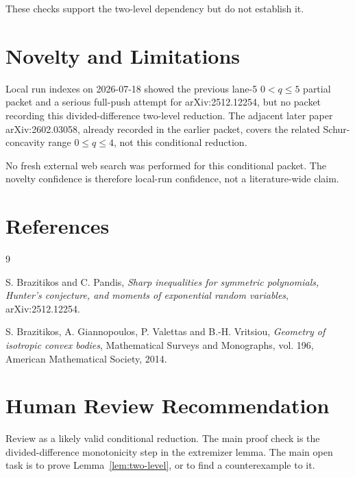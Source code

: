 \documentclass[11pt]{amsart}
\begin{document}
These checks support the two-level dependency but do not establish it.

\section*{Novelty and Limitations}

Local run indexes on 2026-07-18 showed the previous lane-5 \(0<q\le5\)
partial packet and a serious full-push attempt for arXiv:2512.12254, but no
packet recording this divided-difference two-level reduction.  The adjacent
later paper arXiv:2602.03058, already recorded in the earlier packet, covers
the related Schur-concavity range \(0\le q\le4\), not this conditional
reduction.

No fresh external web search was performed for this conditional packet.  The
novelty confidence is therefore local-run confidence, not a literature-wide
claim.

\section*{References}

\begin{thebibliography}{9}

S. Brazitikos and C. Pandis,
\emph{Sharp inequalities for symmetric polynomials, Hunter's conjecture, and
moments of exponential random variables},
arXiv:2512.12254.

S. Brazitikos, A. Giannopoulos, P. Valettas and B.-H. Vritsiou,
\emph{Geometry of isotropic convex bodies},
Mathematical Surveys and Monographs, vol. 196, American Mathematical Society,
2014.

\end{thebibliography}

\section*{Human Review Recommendation}

Review as a likely valid conditional reduction.  The main proof check is the
divided-difference monotonicity step in the extremizer lemma.  The main open
task is to prove Lemma~\ref{lem:two-level}, or to find a counterexample to it.
\end{document}
